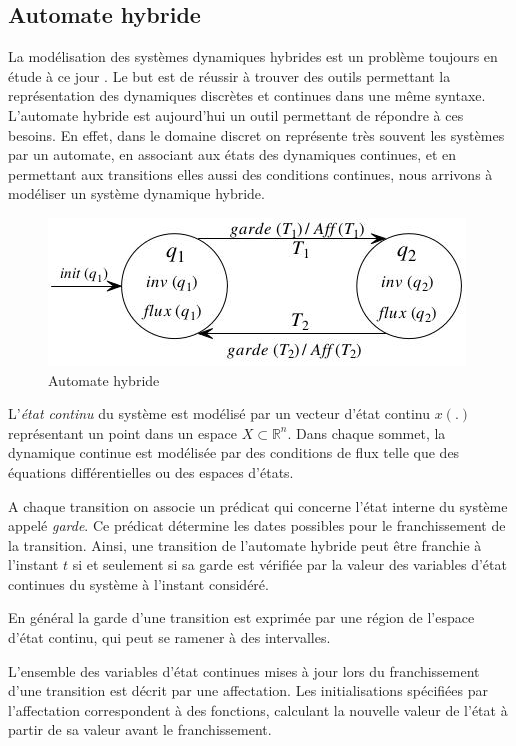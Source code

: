 \subsection{Automate hybride}
La modélisation des systèmes dynamiques hybrides est un problème toujours en étude à ce jour \cite{goebel_hybrid_2012}. Le but est de réussir à trouver des outils permettant la représentation des dynamiques discrètes et continues dans une même syntaxe. L'automate hybride \cite{henzinger_theory_2000} est aujourd'hui un outil permettant de répondre à ces besoins. En effet, dans le domaine discret on représente très souvent les systèmes par un automate, en associant aux états des dynamiques continues, et en permettant aux transitions elles aussi des conditions continues, nous arrivons à modéliser un système dynamique hybride.

\begin{figure}[h]
	\centering	
	\includegraphics{images/automateHybride.jpeg}
	\caption{Automate hybride}
	\label{exempleAutomateHybride}
\end{figure}

L'\textit{état continu} du système est modélisé par un vecteur d'état continu $x(.)$ représentant un point dans un espace $X \subset \mathbb{R}^n$. Dans chaque sommet, la dynamique continue est modélisée par des conditions de flux telle que des équations différentielles ou des espaces d'états.

A chaque transition on associe un prédicat qui concerne l'état interne du système appelé \textit{garde}. Ce prédicat détermine les dates possibles pour le franchissement de la transition. Ainsi, une transition de l'automate hybride peut être franchie à l'instant $t$ si et seulement si sa garde est vérifiée par la valeur des variables d'état continues du système à l'instant considéré.

En général la garde d'une transition est exprimée par une région de l'espace d'état continu, qui peut se ramener à des intervalles.

L'ensemble des variables d'état continues mises à jour lors du franchissement d'une transition est décrit par une affectation. Les initialisations spécifiées par l'affectation correspondent à des fonctions, calculant la nouvelle valeur de l'état à partir de sa valeur avant le franchissement.


